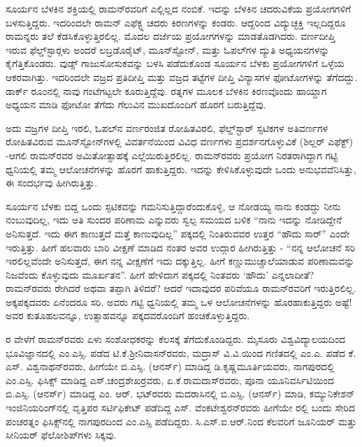 ಸೂರ್ಯನ ಬೆಳಕಿನ ಶಕ್ತಿಯಲ್ಲಿ ರಾಮನ್‍ರವರಿಗೆ ಎಲ್ಲಿಲ್ಲದ ನಂಬಿಕೆ. ಇದನ್ನು ಬೆಳಕಿನ ಚದರುವಿಕೆಯ ಪ್ರಯೋಗಗಳಿಗೆ ಬಳಸುತ್ತಿದ್ದರು. ಇದರಿಂದಲೇ ರಾಮನ್ ಎಫೆಕ್ಟ್ನ ಚದರು ಕಿರಣಗಳನ್ನು ಕಂಡರು. ಆದ್ದರಿಂದ ವಿದ್ಯುಚ್ಛಕ್ತಿ ಇಲ್ಲದಿದ್ದರೂ ರಾಮನ್ನರು ತಲೆ ಕೆಡಸಿಕೊಳ್ಳುತ್ತಿರಲಿಲ್ಲ. ಮೊದಲ ದರ್ಜೆಯ ಪ್ರಯೋಗಗಳನ್ನು ಮಾಡತೊಡಗಿದರು. ವರ್ಣದೀಪ್ತಿ ಇರುವ ಫೆಲ್ಡ್‌ಸ್ಟಾರ್‍ಗಳು ಅಂದರೆ ಲಬ್ರಡೊರೈಟ್, ಮೂನ್‍ಸ್ಟೋನ್, ಮತ್ತು ಓಪಲ್‍ಗಳ ದ್ಯುತಿ ಅಧ್ಯಯನಗಳನ್ನು ಕೈಗೆತ್ತಿಕೊಂಡರು. ವುಡ್ಸ್ ಗಾಜುಸೋಸುಕವನ್ನು ಬಳಸಿ ಪಡೆದುಕೊಂಡ ಸೂರ್ಯನ ಬೆಳಕು ಪ್ರಯೋಗಗಳಿಗೆ ಒಳ್ಳೆಯ ಆಕರವಾಗಿತ್ತು. ಇದರಿಂದಲೇ ವಜ್ರದ ಪ್ರತಿದೀಪ್ತಿ ಮತ್ತು ವಜ್ರದ ತಟ್ಟೆಗಳ ದೀಪ್ತಿ ವಿನ್ಯಾಸಗಳ ಫೋಟೋಗಳನ್ನು ತೆಗೆದದ್ದು. ಡಾರ್ಕ್ ರೂಂನಲ್ಲಿ ನಾವು ಗಂಟೆಗಟ್ಟಲೇ ಕೂರುತ್ತಿದ್ದೆವು. ರತ್ನಗಳ ಮೂಲಕ ಬೆಳಕಿನ ಕಿರಣವೊಂದು ಹಾಯ್ದಾಗ ಅಧ್ಯಯನ ಮಾಡಿ ಫೋಟೋ ತೆಗೆದು ಗೆಲುವಿನ ಮುಖದೊಂದಿಗೆ ಹೊರಗೆ ಬರುತ್ತಿದ್ದೆವು.

ಅದು ವಜ್ರಗಳ ದೀಪ್ತಿ ಇರಲಿ, ಓಪಲ್‍ನ ವರ್ಣರಂಜಿತ ರೋಹಿತವಿರಲಿ, ಫೆಲ್ಡ್‌ಸ್ಟಾರ್ ಸ್ಫಟಿಕಗಳ ಅತಿವರ್ಣಗಳ ರೋಹಿತವಿರುವ ಮೂನ್‍ಸ್ಟೋನ್‍ಗಳಲ್ಲಿ ವಿವರ್ತನೆಯಿಂದ ವಿವಿಧ ವರ್ಣಗಳು ಪ್ರದರ್ಶನಗೊಳ್ಳುವಿಕೆ (ಶಿಲ್ಲರ್ ಎಫೆಕ್ಟ್) -ಆಗಲಿ ರಾಮನ್‍ರವರ ಅಮಿತೋತ್ಸಾಹಕ್ಕೆ ಎಲ್ಲೆಯಿರುತ್ತಿರಲಿಲ್ಲ. ರಾಮನ್‍ರವರು ಪ್ರಯೋಗ ನಿರತರಾಗಿದ್ದಾಗ ಗಟ್ಟಿ ಧ್ವನಿಯಲ್ಲಿ ತಮ್ಮ ಆಲೋಚನೆಗಳನ್ನು ಹೊರಗೆ ಹಾಕುತ್ತಿದ್ದರು. ಇದನ್ನು ಕೇಳಿಸಿಕೊಳ್ಳುವುದೇ ಒಂದು ಅನುಭವವೆನಿಸಿತ್ತು, ಈ ಸಂದರ್ಭವು ಹೀಗಿರುತ್ತಿತ್ತು.

ಸೂರ್ಯನ ಬೆಳಕು ಬಿದ್ದ ಒಂದು ಸ್ಫಟಿಕವನ್ನು ಗಮನಿಸುತ್ತಿದ್ದಾರೆಂದುಕೊಳ್ಳಿ, ಆ ನೋಡಯ್ಯ ನಾನು ಕಂಡದ್ದು ನೀನು ನಂಬುವುದಿಲ್ಲ, ಇದು ಅತಿ ಸುಂದರ ಪರಿಣಾಮ ಎನ್ನುವರು ಸ್ವಲ್ಪ ಸಮಯದ ಬಳಿಕ “ನಾನು ಇದನ್ನು ನೋಡಿದ್ದೇನೆ ಅನಿಸುತ್ತದೆ. ಇದು ಈಗ ಕಾಣುತ್ತದೆ ಮತ್ತೆ ಕಾಣುವುದಿಲ್ಲ” ಪಕ್ಕದಲ್ಲಿ ನಿಂತಿರುವವರ ಉತ್ತರ “ಹೌದು ಸಾರ್” ಎಂದೇ ಇರುತ್ತಿತ್ತು. ಹೀಗೆ ಹಲವಾರು ಬಾರಿ ವೀಕ್ಷಣೆ ಮಾಡಿದ ನಂತರ ಅವರ ಉದ್ಗಾರ ಹೀಗಿರುತ್ತಿತ್ತು - “ನನ್ನ ಆಲೋಚನೆ ಸರಿ ಇರಲಿಲ್ಲವೆಂದೇ ಅನಿಸುತ್ತದೆ, ಈಗ ನನ್ನ ವೀಕ್ಷಣೆಗೆ ಇದು ದಕ್ಕುತ್ತಿಲ್ಲ. ಹೀಗೆ ಕಣ್ಣುಮುಚ್ಚಾಲೆಯಾಡುವ ಪರಿಣಾಮವನ್ನು ನಿಜವೆಂದು ಕೊಳ್ಳುವುದು ಮೂರ್ಖತನ”. ಹೀಗೆ ಹೇಳಿದಾಗ ಪಕ್ಕದಲ್ಲಿ ನಿಂತವರು ‘ಹೌದು’ ಎನ್ನಲಾದೀತೆ? ರಾಮನ್‍ರವರು ರೇಗಿದರೆ ಅಥವಾ ತಪ್ಪಾಗಿ ತಿಳಿದರೆ? ಆದರೆ ಇದಾವುದರ ಪರಿವೆಯೂ ರಾಮನ್‍ರವರಿಗೆ ಇರುತ್ತಿರಲಿಲ್ಲ. ಅಕ್ಕಪಕ್ಕದವರು ಏನೆಂದರೂ ಸರಿ. ಅವರು ಗಟ್ಟಿ ಧ್ವನಿಯಲ್ಲಿ ತಮ್ಮ ಒಳ ಆಲೋಚನೆಗಳನ್ನು ಹೊರಹಾಕುತ್ತಿದ್ದರು ಅಷ್ಟೆ! ಅವರ ಕುತೂಹಲವನ್ನೂ, ಉತ್ಸಾಹವನ್ನೂ ಪಕ್ಕದವರೊಂದಿಗೆ ಹಂಚಿಕೊಳ್ಳುತ್ತಿದ್ದರು.

ರ ವೇಳೆಗೆ ರಾಮನ್‍ರವರು ಏಳು ಸಂಶೋಧಕರನ್ನು ಕೆಲಸಕ್ಕೆ ತೆಗೆದುಕೊಂಡಿದ್ದರು. ಮೈಸೂರು ವಿಶ್ವವಿದ್ಯಾಲಯದಿಂದ ಭೂವಿಜ್ಞಾನದಲ್ಲಿ ಎಂ.ಎಸ್ಸಿ. ಪಡೆದ ಟಿ.ಕೆ.ಶ‍್ರೀನಿವಾಸನ್‍ರವರು, ಮದ್ರಾಸ್ ವಿ.ವಿ.ಯಿಂದ ಗಣಿತದಲ್ಲಿ ಎಂ.ಎ. ಪಡೆದ ಕೆ. ಎಸ್. ವಿಶ್ವನಾಥನ್‍ರವರು, ಹೀಗೆಯೇ ಬಿ.ಎಸ್ಸಿ. (ಆನರ್ಸ್) ಮಾಡಿದ್ದ ಡಿ.ಕೃಷ್ಣಮೂರ್ತಿಯವರು, ನಾಗಪುರದಲ್ಲಿ ಎಂ.ಎಸ್ಸಿ. ಫಿಸಿಕ್ಸ್ ಮಾಡಿದ್ದ ಎಸ್.ಚಂದ್ರಶೇಖರ್‍ರವರು, ಏ.ಕೆ.ರಾಮದಾಸ್‍ರವರು, ಪೂನಾ ಯೂನಿವರ್ಸಿಟಿಯಿಂದ ಬಿ.ಎಸ್ಸಿ. (ಆನರ್ಸ್) ಮಾಡಿದ್ದ ಎಂ. ಆರ್. ಭಟ್‍ರವರು ಮದರಾಸಿನಲ್ಲಿ ಬಿ.ಎಸ್ಸಿ. (ಆನರ್ಸ್) ಮಾಡಿ, ಕಮ್ಯುನಿಕೇಶನ್ ಇಂಜಿನಿಯರಿಂಗ್‍ನಲ್ಲಿ ವೃತ್ತಿಪರ ಸರ್ಟಿಫಿಕೇಟ್ ಪಡೆದಿದ್ದ ಎಸ್. ವೆಂಕಟೇಶ್ವರನ್‍ರವರು ಹೀಗೆಯೇ ರಲ್ಲಿ ಬಂದು ಸೇರಿದ ಪಂಚರತ್ನಂ ಫಿಸಿಕ್ಸ್‌ನಲ್ಲಿ ನಾಗಪುರದಿಂದ ಎಂ.ಎಸ್ಸಿ ಪಡೆದಿದ್ದರು. ಸಿ.ಎಸ್.ಐ.ಆರ್.ನಿಂದ ಕೆಲವರಿಗೆ ಜೂನಿಯರ್ ಮತ್ತು ಸೀನಿಯರ್ ಫೆಲೋಶಿಪ್‍ಗಳು ಸಿಕ್ಕವು.

